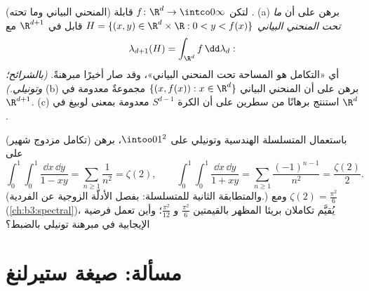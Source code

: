 \begin{exercise}[$\star\star$]\label{exo:b3:product:11}
(المنحني البياني وما تحته) لتكن $f \colon \R^d \to \intco0\infty$ قابلة .
(a) برهن على أن \emph{ما تحت المنحني البياني} $H = \{(x, y) \in
\R^d\times\R : 0 < y < f(x)\}$ قابل
 في $\R^{d+1}$ مع
\[
\lambda_{d+1}(H) = \int_{\R^d}f\,\dd\lambda_d :
\]
أي «التكامل هو المساحة تحت المنحني البياني»، وقد صار أخيرًا
مبرهنةً. \emph{(بالشرائح؛ وتونيلي.)}
(b) برهن على أن المنحني البياني $\{(x, f(x)) : x \in \R^d\}$ مجموعةٌ معدومة  في
$\R^{d+1}$.
(c) استنتج برهانًا من سطرين على أن الكرة $S^{d-1}$ معدومة 
بمعنى لوبيغ في $\R^d$.
\end{exercise}

\begin{exercise}[$\star\star$]\label{exo:b3:product:12}
(تكامل مزدوج شهير) باستعمال المتسلسلة الهندسية وتونيلي على
$\intoo01^2$، برهن على
\[
\int_0^1\!\!\int_0^1\frac{\dd x\,\dd y}{1 - xy}
= \sum_{n\geq1}\frac1{n^2} = \zeta(2),
\qquad
\int_0^1\!\!\int_0^1\frac{\dd x\,\dd y}{1 + xy}
= \sum_{n\geq1}\frac{(-1)^{n-1}}{n^2} = \frac{\zeta(2)}2 .
\]
(والمتطابقة الثانية للمتسلسلة: بفصل الأدلّة الزوجية عن الفردية.)
ومع $\zeta(2) = \frac{\pi^2}6$ (\cref{ch:b3:spectral})، يُقيَّم تكاملان بريئا المظهر بالقيمتين
$\frac{\pi^2}6$ و $\frac{\pi^2}{12}$؛ وأين تعمل فرضية الإيجابية في مبرهنة
تونيلي بالضبط؟
\end{exercise}

\section{مسألة: صيغة ستيرلنغ}

